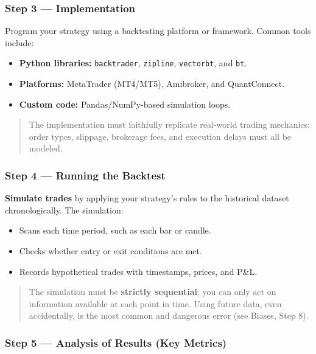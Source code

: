\documentclass[12pt,openany]{book}
\begin{document}
\subsubsection{Step 3 --- Implementation}

Program your strategy using a backtesting platform or framework. Common tools include:
\begin{itemize}[leftmargin=*]
    \item \textbf{Python libraries:} \texttt{backtrader}, \texttt{zipline}, \texttt{vectorbt}, and \texttt{bt}.
    \item \textbf{Platforms:} MetaTrader (MT4/MT5), Amibroker, and QuantConnect.
    \item \textbf{Custom code:} Pandas/NumPy-based simulation loops.
\end{itemize}

\begin{quote}
    The implementation must faithfully replicate real-world trading mechanics: order types, slippage, brokerage fees, and execution delays must all be modeled.
\end{quote}

\subsubsection{Step 4 --- Running the Backtest}

\textbf{Simulate trades} by applying your strategy's rules to the historical dataset chronologically. The simulation:
\begin{itemize}[leftmargin=*]
    \item Scans each time period, such as each bar or candle.
    \item Checks whether entry or exit conditions are met.
    \item Records hypothetical trades with timestamps, prices, and P\&L.
\end{itemize}

\begin{quote}
    The simulation must be \textbf{strictly sequential}; you can only act on information available at each point in time. Using future data, even accidentally, is the most common and dangerous error (see Biases, Step 8).
\end{quote}

\subsubsection{Step 5 --- Analysis of Results (Key Metrics)}
\end{document}
